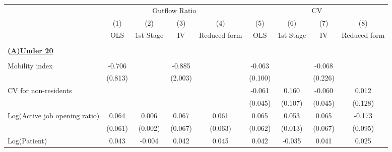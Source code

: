 \begin{tabular}{l*{8}{c}} \toprule
                    &\multicolumn{4}{c}{Outflow Ratio}                                                      &\multicolumn{4}{c}{CV}                                                                 \\\cmidrule(lr){2-5}\cmidrule(lr){6-9}
                    &\multicolumn{1}{c}{(1)}         &\multicolumn{1}{c}{(2)}         &\multicolumn{1}{c}{(3)}         &\multicolumn{1}{c}{(4)}         &\multicolumn{1}{c}{(5)}         &\multicolumn{1}{c}{(6)}         &\multicolumn{1}{c}{(7)}         &\multicolumn{1}{c}{(8)}         \\
                    &         OLS         &   1st Stage         &          IV         &Reduced form         &         OLS         &   1st Stage         &          IV         &Reduced form         \\
\hline \\ \multicolumn{9}{l}{\textbf{\underline{(A)Under 20}}} \\\\[-1ex]
Mobility index      &      -0.706         &                     &      -0.885         &                     &      -0.063         &                     &      -0.068         &                     \\
                    &     (0.813)         &                     &     (2.003)         &                     &     (0.100)         &                     &     (0.226)         &                     \\
\addlinespace
CV for non-residents&                     &                     &                     &                     &      -0.061         &       0.160         &      -0.060         &       0.012         \\
                    &                     &                     &                     &                     &     (0.045)         &     (0.107)         &     (0.045)         &     (0.128)         \\
\addlinespace
Log(Active job opening ratio)&       0.064         &       0.006\sym{***}&       0.067         &       0.061         &       0.065         &       0.053\sym{***}&       0.065         &      -0.173\sym{*}  \\
                    &     (0.061)         &     (0.002)         &     (0.067)         &     (0.063)         &     (0.062)         &     (0.013)         &     (0.067)         &     (0.095)         \\
\addlinespace
Log(Patient)        &       0.043\sym{**} &      -0.004\sym{***}&       0.042\sym{*}  &       0.045\sym{**} &       0.042\sym{**} &      -0.035\sym{***}&       0.041\sym{*}  &       0.025         \\

\end{tabular}
